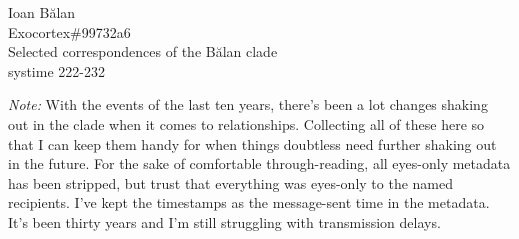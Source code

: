 Ioan Bălan\\
Exocortex\#99732a6\\
Selected correspondences of the Bălan clade\\
systime 222-232

\emph{Note:} With the events of the last ten years, there's been a lot changes shaking out in the clade when it comes to relationships. Collecting all of these here so that I can keep them handy for when things doubtless need further shaking out in the future. For the sake of comfortable through-reading, all eyes-only metadata has been stripped, but trust that everything was eyes-only to the named recipients. I've kept the timestamps as the message-sent time in the metadata. It's been thirty years and I'm still struggling with transmission delays.
